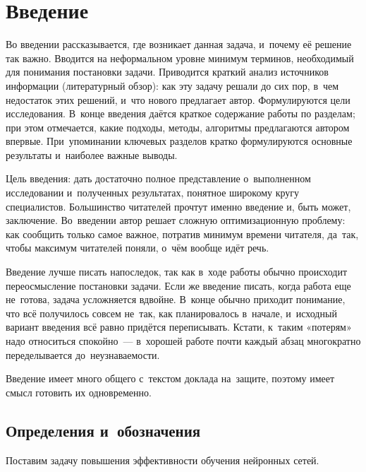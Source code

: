 \documentclass[12pt, fleqn]{article}
\begin{document}
\newpage
\section{Введение}

Во введении рассказывается, где возникает данная задача, и~почему её решение так важно.
Вводится на неформальном уровне минимум терминов, необходимый для понимания постановки задачи.
Приводится краткий анализ источников информации (литературный обзор):
как эту задачу решали до сих пор, в~чем недостаток этих решений, и~что нового предлагает автор.
Формулируются цели исследования. 
В~конце введения даётся краткое содержание работы по разделам; 
при этом отмечается, какие подходы, методы, алгоритмы предлагаются автором впервые. 
При~упоминании ключевых разделов кратко формулируются основные результаты и~наиболее важные выводы.

Цель введения: дать достаточно полное представление о~выполненном исследовании 
и~полученных результатах, понятное широкому кругу специалистов. 
Большинство читателей прочтут именно введение и, быть может, заключение. 
Во~введении автор решает сложную оптимизационную проблему: 
как сообщить только самое важное, потратив минимум времени читателя,
да~так, чтобы максимум читателей поняли, о~чём вообще идёт речь.

Введение лучше писать напоследок, так как в~ходе работы обычно происходит переосмысление постановки задачи.
Если же введение писать, когда работа еще не~готова, задача усложняется вдвойне.
В~конце обычно приходит понимание, что всё получилось совсем не~так, как планировалось в~начале,
и~исходный вариант введения всё равно придётся переписывать. 
Кстати, к~таким «потерям» надо относиться спокойно~--- в~хорошей работе почти каждый абзац многократно переделывается до~неузнаваемости.
 
Введение имеет много общего с~текстом доклада на~защите, поэтому имеет смысл готовить их одновременно.

\subsection{Определения и~обозначения}

Поставим задачу повышения эффективности обучения нейронных сетей.
\end{document}
